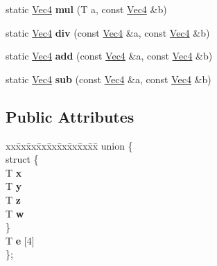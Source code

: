 \begin{DoxyCompactItemize}
\item 
\hypertarget{classps_1_1base_1_1Vec4_a56e36f24af790d92a12bf3dd56ea5601}{}static \hyperlink{classps_1_1base_1_1Vec4}{Vec4} {\bfseries mul} (T a, const \hyperlink{classps_1_1base_1_1Vec4}{Vec4} \&b)\label{classps_1_1base_1_1Vec4_a56e36f24af790d92a12bf3dd56ea5601}

\item 
\hypertarget{classps_1_1base_1_1Vec4_a5f9a1f3fa2e9a9984090ad55f19cdca5}{}static \hyperlink{classps_1_1base_1_1Vec4}{Vec4} {\bfseries div} (const \hyperlink{classps_1_1base_1_1Vec4}{Vec4} \&a, const \hyperlink{classps_1_1base_1_1Vec4}{Vec4} \&b)\label{classps_1_1base_1_1Vec4_a5f9a1f3fa2e9a9984090ad55f19cdca5}

\item 
\hypertarget{classps_1_1base_1_1Vec4_a0427f164fca79a6d68f2c5ab282b9741}{}static \hyperlink{classps_1_1base_1_1Vec4}{Vec4} {\bfseries add} (const \hyperlink{classps_1_1base_1_1Vec4}{Vec4} \&a, const \hyperlink{classps_1_1base_1_1Vec4}{Vec4} \&b)\label{classps_1_1base_1_1Vec4_a0427f164fca79a6d68f2c5ab282b9741}

\item 
\hypertarget{classps_1_1base_1_1Vec4_ad8aeaa621064aa6e9105250531cde2fc}{}static \hyperlink{classps_1_1base_1_1Vec4}{Vec4} {\bfseries sub} (const \hyperlink{classps_1_1base_1_1Vec4}{Vec4} \&a, const \hyperlink{classps_1_1base_1_1Vec4}{Vec4} \&b)\label{classps_1_1base_1_1Vec4_ad8aeaa621064aa6e9105250531cde2fc}

\end{DoxyCompactItemize}
\subsection*{Public Attributes}
\begin{DoxyCompactItemize}
\item 
\hypertarget{classps_1_1base_1_1Vec4_afe77832263a1d88225e31d1fab11b540}{}\begin{tabbing}
xx\=xx\=xx\=xx\=xx\=xx\=xx\=xx\=xx\=\kill
union \{\\
\hypertarget{unionps_1_1base_1_1Vec4_1_1_0D13_a14dbf3b2f1da63cb749ccd17b5de80ed}{}\>struct \{\\
\>\>T {\bfseries x}\\
\>\>T {\bfseries y}\\
\>\>T {\bfseries z}\\
\>\>T {\bfseries w}\\
\>\} \label{unionps_1_1base_1_1Vec4_1_1_0D13_a14dbf3b2f1da63cb749ccd17b5de80ed}
\\
\>T {\bfseries e} \mbox{[}4\mbox{]}\\
\}; \label{classps_1_1base_1_1Vec4_afe77832263a1d88225e31d1fab11b540}
\\

\end{tabbing}\end{DoxyCompactItemize}


